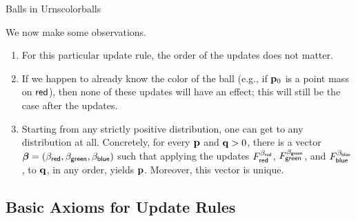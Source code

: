 \documentclass{article}
\begin{document}
\begin{examplex}{Balls in Urns}{colorballs}


    We now make some observations.
    \begin{enumerate}
        \item For this particular update rule, the order of the updates does not matter.
        \item If we happen to already know the color of the ball (e.g., if $\mathbf{p}_0$ is a point mass on ${\mathsf{red}}$), then none of these updates will have an effect; this will still be the case after the updates.
        \item Starting from any strictly positive distribution, one can get to any distribution at all.
        Concretely, for every $\mathbf{p}$ and $\mathbf{q} > 0$, there is a vector
        $\boldsymbol\beta
        = (\beta_{{\mathsf{red}}}, \beta_{{\mathsf{green}}}, \beta_{{\mathsf{blue}}})$
        such that applying the updates
        $F^{\beta_{{\mathsf{red}}}
            }_{{\mathsf{red}}}$,
        $F^{\beta_{{\mathsf{green}}}
            }_{{\mathsf{green}}}$, and
        $F^{\beta_{{\mathsf{blue}}}
            }_{{\mathsf{blue}}}$,
        to $\mathbf{q}$, in any order, yields $\mathbf{p}$. Moreover, this vector is unique.


    \end{enumerate}

\end{examplex}

\subsection{Basic Axioms for Update Rules}
\end{document}
